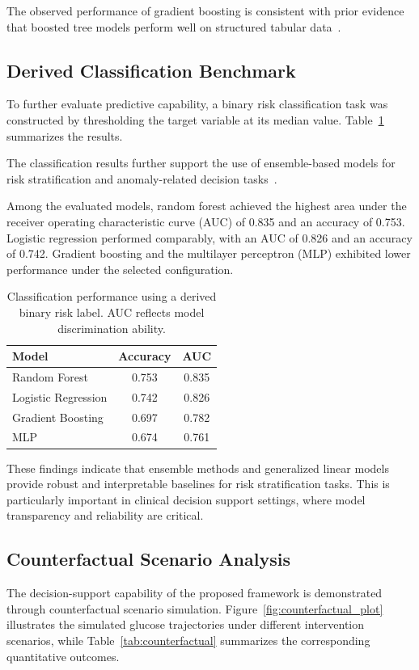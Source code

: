 \documentclass[journal]{IEEEtran}
\begin{document}
The observed performance of gradient boosting is consistent with prior evidence that boosted tree models perform well on structured tabular data~\cite{ref28}.

\subsection{Derived Classification Benchmark}
To further evaluate predictive capability, a binary risk classification task was constructed by thresholding the target variable at its median value. Table~\ref{tab:classification} summarizes the results.

The classification results further support the use of ensemble-based models for risk stratification and anomaly-related decision tasks~\cite{ref15,ref29}.

Among the evaluated models, random forest achieved the highest area under the receiver operating characteristic curve (AUC) of 0.835 and an accuracy of 0.753. Logistic regression performed comparably, with an AUC of 0.826 and an accuracy of 0.742. Gradient boosting and the multilayer perceptron (MLP) exhibited lower performance under the selected configuration.

\begin{table}[htbp]
\centering
\renewcommand{\arraystretch}{1.15}
\setlength{\tabcolsep}{6pt}
\begin{tabular}{>{\raggedright\arraybackslash}p{3.1cm}cc}
\toprule
\rowcolor{headerblue}
\textbf{Model} & \textbf{Accuracy} & \textbf{AUC} \\
\midrule
Random Forest & 0.753 & 0.835 \\
Logistic Regression & 0.742 & 0.826 \\
Gradient Boosting & 0.697 & 0.782 \\
MLP & 0.674 & 0.761 \\
\bottomrule
\end{tabular}
\caption{Classification performance using a derived binary risk label. AUC reflects model discrimination ability.}
\label{tab:classification}
\end{table}

These findings indicate that ensemble methods and generalized linear models provide robust and interpretable baselines for risk stratification tasks. This is particularly important in clinical decision support settings, where model transparency and reliability are critical.

\subsection{Counterfactual Scenario Analysis}
The decision-support capability of the proposed framework is demonstrated through counterfactual scenario simulation. Figure~\ref{fig:counterfactual_plot} illustrates the simulated glucose trajectories under different intervention scenarios, while Table~\ref{tab:counterfactual} summarizes the corresponding quantitative outcomes.
\end{document}
